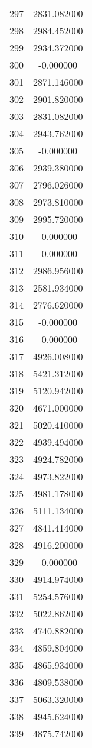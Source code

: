 \documentclass[12pt]{article}
\begin{document}
\begin{longtable}{@{}cc@{}}
297 & 2831.082000 \\
298 & 2984.452000 \\
299 & 2934.372000 \\
300 & -0.000000 \\
301 & 2871.146000 \\
302 & 2901.820000 \\
303 & 2831.082000 \\
304 & 2943.762000 \\
305 & -0.000000 \\
306 & 2939.380000 \\
307 & 2796.026000 \\
308 & 2973.810000 \\
309 & 2995.720000 \\
310 & -0.000000 \\
311 & -0.000000 \\
312 & 2986.956000 \\
313 & 2581.934000 \\
314 & 2776.620000 \\
315 & -0.000000 \\
316 & -0.000000 \\
317 & 4926.008000 \\
318 & 5421.312000 \\
319 & 5120.942000 \\
320 & 4671.000000 \\
321 & 5020.410000 \\
322 & 4939.494000 \\
323 & 4924.782000 \\
324 & 4973.822000 \\
325 & 4981.178000 \\
326 & 5111.134000 \\
327 & 4841.414000 \\
328 & 4916.200000 \\
329 & -0.000000 \\
330 & 4914.974000 \\
331 & 5254.576000 \\
332 & 5022.862000 \\
333 & 4740.882000 \\
334 & 4859.804000 \\
335 & 4865.934000 \\
336 & 4809.538000 \\
337 & 5063.320000 \\
338 & 4945.624000 \\
339 & 4875.742000 \\

\end{longtable}
\end{document}

